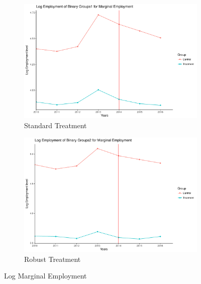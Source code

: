 \documentclass[a4paper]{article}
\begin{document}
{\begin{figure}
\begin{subfigure}[h]{0.5\linewidth}
\includegraphics[width=\textwidth]{q6/plot_treatment_ta1marginal.pdf}
\caption{Standard Treatment}
\end{subfigure}
\hfill
\begin{subfigure}[h]{0.5\linewidth}
\includegraphics[width=\textwidth]{q6/plot_treatment_ta2marginal.pdf}
\caption{Robust Treatment}
\end{subfigure}%
\caption{Log Marginal Employment}
\label{q6m}
\end{figure}


}
\end{document}
